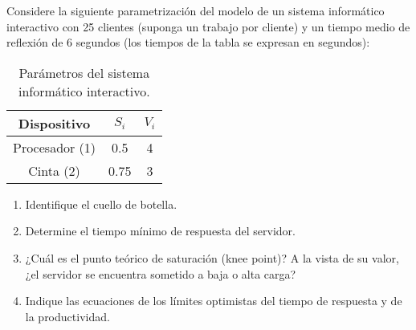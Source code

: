 \begin{ejercicio}\label{ej:5.13}
    Considere la siguiente parametrización del modelo de un sistema informático interactivo con 25 clientes (suponga un trabajo por cliente) y un tiempo medio de reflexión de 6 segundos (los tiempos de la tabla se expresan en segundos):
    \begin{table}[h]
        \centering
        \begin{tabular}{|c|c|c|}
            \hline
            Dispositivo & $S_i$ & $V_i$ \\
            \hline
            Procesador (1) & 0.5 & 4 \\
            Cinta (2) & 0.75 & 3 \\
            \hline
        \end{tabular}
        \caption{Parámetros del sistema informático interactivo.}
        \label{tab:5.13}
    \end{table}
    \begin{enumerate}
        \item Identifique el cuello de botella.
        \item Determine el tiempo mínimo de respuesta del servidor.
        \item ¿Cuál es el punto teórico de saturación (knee point)? A la vista de su valor, ¿el servidor se encuentra sometido a baja o alta carga?
        \item Indique las ecuaciones de los límites optimistas del tiempo de respuesta y de la productividad.
    \end{enumerate}
\end{ejercicio}
\begin{comment}
\solucion
    \begin{enumerate}
        \item El cuello de botella es la cinta.
        \item El tiempo mínimo de respuesta es 4.25 segundos.
        \item El punto teórico de saturación es $N_T^* = 4.5$. Por lo tanto, el servidor está en un régimen de alta carga.
        \item Los límites son $R_0 \geq \max\{4.25, 2.25 \times N_T - 6\}$ y $X_0 \leq \min\{N_T/10.25, 0.44\}$.
    \end{enumerate}
\end{comment}

